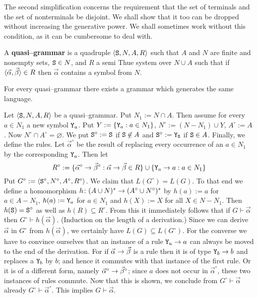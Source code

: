 The second simplification concerns the requirement that the set of
terminals and the set of nonterminals be disjoint. We shall show
that it too can be dropped without increasing the generative power.
We shall sometimes work without this condition, as it can be
cumbersome to deal with.
\begin{defn}
A \textbf{quasi--grammar} is a quadruple $\langle \mbox{\tt S}, N, A, R\rangle$
such that $A$ and $N$ are finite and nonempty sets, $\mbox{\tt S} \in N$,
and $R$ a semi Thue system over $N \cup A$ such that if
$\langle \vec{\alpha}, \vec{\beta}\rangle \in R$ then
$\vec{\alpha}$ contains a symbol from $N$.
\end{defn}
\begin{prop}
For every quasi--grammar there exists a grammar which generates
the same language.
\end{prop}
\proofbeg
Let $\langle \mbox{\tt S}, N, A, R\rangle$ be a quasi--grammar.
Put $N_1 := N \cap A$. Then assume for every
$a \in N_1$ a new symbol $\mbox{\tt Y}_a$.
Put $Y := \{\mbox{\tt Y}_a : a \in N_1\}$,
$N^{\circ} := (N - N_1) \cup Y$, $A^{\circ} := A$.
Now $N^{\circ} \cap A^{\circ} = \varnothing$.
We put $\mbox{\tt S}^{\circ} := \mbox{\tt S}$
if $\mbox{\tt S} \not\in A$ and $\mbox{\tt S}^{\circ}
:= \mbox{\tt Y}_{\tt S}$ if $\mbox{\tt S} \in A$. Finally, we
define the rules. Let $\vec{\alpha}^{\circ}$ be the result of
replacing every occurrence of an $a \in N_1$ by
the corresponding $\mbox{\tt Y}_a$. Then let
\begin{equation}
R^{\circ} := \{\vec{\alpha}^{\circ} \rightarrow \vec{\beta}^{\circ} :
\vec{\alpha} \rightarrow \vec{\beta} \in R\} \cup
\{\mbox{\tt Y}_a \rightarrow a : a \in N_1\} 
\end{equation}
Put $G^{\circ} := \langle \mbox{\tt S}^{\circ}, N^{\circ}, A^{\circ},
R^{\circ}\rangle$. We claim that $L(G^{\circ}) = L(G)$.
To that end we define a homomorphism
$h \colon (A \cup N)^{\ast} \rightarrow (A^{\circ} \cup N^{\circ})^{\ast}$
by $h(a) := a$ for $a \in A - N_1$, $h(a) := \mbox{\tt Y}_a$ for
$a \in N_1$ and $h(X) := X$ for all $X \in N - N_1$. Then
$h(\mbox{\tt S}) = \mbox{\tt S}^{\circ}$ as well as $h(R) %
\subseteq R^{\circ}$. From this it immediately follows that 
if $G \vdash \vec{\alpha}$ then $G^{\circ} \vdash h(\vec{\alpha})$. 
(Induction on the length of a derivation.)  
Since we can derive $\vec{\alpha}$ in $G^{\circ}$ from 
$h(\vec{\alpha})$, we certainly have $L(G) \subseteq L(G^{\circ})$. 
For the converse we have to convince ourselves that an instance of 
a rule $\mbox{\tt Y}_a \rightarrow a$ can always be moved to the end of 
the derivation. For if
$\vec{\alpha} \rightarrow \vec{\beta}$ is a rule then it is of type
$\mbox{\tt Y}_b \rightarrow b$ and replaces a  $\mbox{\tt Y}_b$ by $b$;
and hence it commutes with that instance of the first rule.
Or it is of a different form, namely $\vec{\alpha}^{\circ} \pf %
\vec{\beta}^{\circ}$; since $a$ does not occur in $\vec{\alpha}^{\circ}$,
these two instances of rules commute. Now that this is shown,
we conclude from $G^{\circ} \vdash \vec{\alpha}$ already
$G^{\circ} \vdash \vec{\alpha}^{\circ}$.
This implies $G \vdash \vec{\alpha}$.
\proofend

